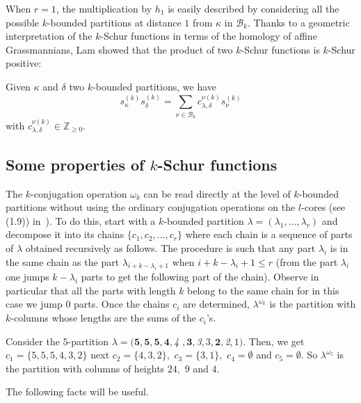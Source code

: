 \documentclass[ALCO,ThmDefs,Unicode,epreuves]{cedram}
\begin{document}
When $r=1$, the multiplication by $h_{1}$ is easily described by considering
all the possible $k$-bounded partitions at distance $1$ from $\kappa$ in
$\mathcal{B}_{k}$. Thanks to a geometric interpretation of the $k$-Schur
functions in terms of the homology of affine Grassmannians, Lam showed that
the product of two $k$-Schur functions is $k$-Schur positive:

\begin{theorem} Given $\kappa$ and $\delta$ two $k$-bounded partitions, we have
\[
s_{\kappa}^{(k)}s_{\delta}^{(k)}=\sum_{\nu\in\mathcal{B}_{k}}c_{\lambda
,\delta}^{\nu(k)}s_{\nu}^{(k)}%
\]
with $c_{\lambda,\delta}^{\nu(k)}\in\mathbb{Z}_{\geq0}$.
\end{theorem}

\subsection{Some properties of \texorpdfstring{$k$}{K}-Schur functions}

The $k$-conjugation operation $\omega_{k}$ can be read directly at the level
of $k$-bounded partitions without using the ordinary conjugation operations on
the $l$-cores (see (1.9)) in~\cite{LLMSSZ}). To do this, start with a
$k$-bounded partition $\lambda=(\lambda_{1},\ldots,\lambda_{r})$ and decompose
it into its chains $\{c_{1},c_{2},\ldots,c_{r}\}$ where each chain is a
sequence of parts of $\lambda$ obtained recursively as follows. The procedure
is such that any part $\lambda_{i}$ is in the same chain as the part
$\lambda_{i+k-\lambda_{i}+1}$ when $i+k-\lambda_{i}+1\leq r$ (from the part
$\lambda_{i}$ one jumps $k-\lambda_{i}$ parts to get the following part of the
chain). Observe in particular that all the parts with length $k$ belong to the
same chain for in this case we jump $0$ parts. Once the chains $c_{i}$ are
determined, $\lambda^{\omega_{k}}$ is the partition with $k$-columns whose
lengths are the sums of the $c_{i}$'s$.$

\begin{exam}
Consider the $5$-partition $\lambda=(\boldsymbol{5,5,5,4},$\emph{4}%
$,\boldsymbol{3},$\emph{3}$,3,\boldsymbol{2},$\emph{2}$,1)$. Then, we get
$c_{1}=\{5,5,5,4,3,2\}$ next $c_{2}=\{4,3,2\},$ $c_{3}=\{3,1\},$
$c_{4}=\emptyset$ and $c_{5}=\emptyset$. So $\lambda^{\omega_{5}}$ is the
partition with columns of heights $24,$ $9$ and $4$.
\end{exam}

The following facts will be useful.
\end{document}

